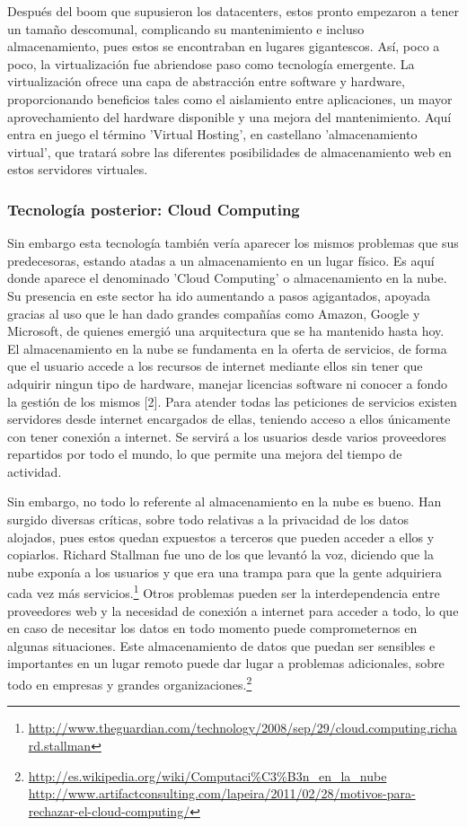 \documentclass[a4paper, 10pt]{article} %
\begin{document}
Después del boom que supusieron los datacenters, estos pronto empezaron a tener un tamaño descomunal, complicando su mantenimiento e incluso almacenamiento, pues estos se encontraban en lugares gigantescos. Así, poco a poco, la virtualización fue abriendose paso como tecnología emergente. La virtualización ofrece una capa de abstracción entre software y hardware, proporcionando beneficios tales como el aislamiento entre aplicaciones, un mayor aprovechamiento del hardware disponible y una mejora del mantenimiento. Aquí entra en juego el término 'Virtual Hosting', en castellano 'almacenamiento virtual', que tratará sobre las diferentes posibilidades de almacenamiento web en estos servidores virtuales. 

\subsubsection{Tecnología posterior: Cloud Computing}

Sin embargo esta tecnología también vería aparecer los mismos problemas que sus predecesoras, estando atadas a un almacenamiento en un lugar físico. Es aquí donde aparece el denominado 'Cloud Computing' o almacenamiento en la nube. Su presencia en este sector ha ido aumentando a pasos agigantados, apoyada gracias al uso que le han dado grandes compañías como Amazon, Google y Microsoft, de quienes emergió una arquitectura que se ha mantenido hasta hoy.  \\
El almacenamiento en la nube se fundamenta en la oferta de servicios, de forma que el usuario accede a los recursos de internet mediante ellos sin tener que adquirir ningun tipo de hardware, manejar licencias software ni conocer a fondo la gestión de los mismos [2]. Para atender todas las peticiones de servicios existen servidores desde internet encargados de ellas, teniendo acceso a ellos únicamente con tener conexión a internet. Se servirá a los usuarios desde varios proveedores repartidos por todo el mundo, lo que permite una mejora del tiempo de actividad.

Sin embargo, no todo lo referente al almacenamiento en la nube es bueno. Han surgido diversas críticas, sobre todo relativas a la privacidad de los datos alojados, pues estos quedan expuestos a terceros que pueden acceder a ellos y copiarlos. Richard Stallman fue uno de los que levantó la voz, diciendo que la nube exponía a los usuarios y que era una trampa para que la gente adquiriera cada vez más servicios.\footnote{\url{http://www.theguardian.com/technology/2008/sep/29/cloud.computing.richard.stallman}} Otros problemas pueden ser la interdependencia entre proveedores web y la necesidad de conexión a internet para acceder a todo, lo que en caso de necesitar los datos en todo momento puede comprometernos en algunas situaciones. Este almacenamiento de datos que puedan ser sensibles e importantes en un lugar remoto puede dar lugar a problemas adicionales, sobre todo en empresas y grandes organizaciones.\footnote{\url{http://es.wikipedia.org/wiki/Computaci\%C3\%B3n_en_la_nube} \\ \url{http://www.artifactconsulting.com/lapeira/2011/02/28/motivos-para-rechazar-el-cloud-computing/}}
\end{document}
